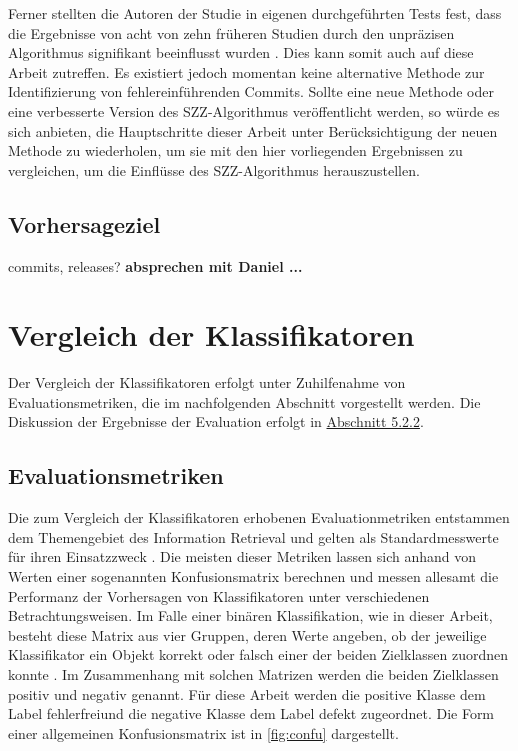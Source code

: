 Ferner stellten die Autoren der Studie in eigenen durchgeführten Tests fest, dass die Ergebnisse von acht von zehn früheren Studien durch den unpräzisen Algorithmus signifikant beeinflusst wurden \cite{Wen2019}. Dies kann somit auch auf diese Arbeit zutreffen. Es existiert jedoch momentan keine alternative Methode zur Identifizierung von fehlereinführenden Commits. Sollte eine neue Methode oder eine verbesserte Version des SZZ-Algorithmus veröffentlicht werden, so würde es sich anbieten, die Hauptschritte dieser Arbeit unter Berücksichtigung der neuen Methode zu wiederholen, um sie mit den hier vorliegenden Ergebnissen zu vergleichen, um die Einflüsse des SZZ-Algorithmus herauszustellen.

\subsection*{Vorhersageziel}
commits, releases?
\textbf{absprechen mit Daniel ...}

\section{Vergleich der Klassifikatoren}

Der Vergleich der Klassifikatoren erfolgt unter Zuhilfenahme von Evaluationsmetriken, die im nachfolgenden Abschnitt vorgestellt werden. Die Diskussion der Ergebnisse der Evaluation erfolgt in \hyperref[results]{Abschnitt 5.2.2}.

\subsection{Evaluationsmetriken}
\label{eval-metrics}

Die zum Vergleich der Klassifikatoren erhobenen Evaluationmetriken entstammen dem Themengebiet des Information Retrieval und gelten als Standardmesswerte für ihren Einsatzzweck \cite{Sammut2017}. Die meisten dieser Metriken lassen sich anhand von Werten einer sogenannten Konfusionsmatrix berechnen und messen allesamt die Performanz der Vorhersagen von Klassifikatoren unter verschiedenen Betrachtungsweisen. Im Falle einer binären Klassifikation, wie in dieser Arbeit, besteht diese Matrix aus vier Gruppen, deren Werte angeben, ob der jeweilige Klassifikator ein Objekt korrekt oder falsch einer der beiden Zielklassen zuordnen konnte \cite{Sammut2017}. Im Zusammenhang mit solchen Matrizen werden die beiden Zielklassen \glqq positiv\grqq{} und \glqq negativ\grqq{} genannt. Für diese Arbeit werden die positive Klasse dem Label \glqq fehlerfrei\grqq und die negative Klasse dem Label \glqq defekt\grqq{} zugeordnet. Die Form einer allgemeinen Konfusionsmatrix ist in \autoref{fig:confu} dargestellt.

